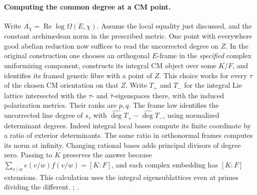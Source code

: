 \paragraph{Computing the common degree at a CM point.}
Write \(A_\chi=\operatorname{Re}\log\Omega(E,\chi)\). Assume the
local equality just discussed, and the constant archimedean norm
in the prescribed metric. One point with everywhere good abelian
reduction now suffices to read the uncorrected degree on \(Z\).
In the original construction one chooses an orthogonal \(E\)-frame
in the \emph{specified} complex uniformizing component, constructs
its integral CM object over some \(K/F\), and identifies its framed
generic fibre with a point of \(Z\). This choice works for every
\(\tau\) of the chosen CM orientation on that \(Z\). Write \(T_+\)
and \(T_-\) for the integral Lie lattice intersected with the
\(\tau\)- and \(\bar\tau\)-eigenspaces there, with the induced
polarization metrics. Their ranks are \(p,q\). The frame law
identifies the uncorrected line degree of \(s_\tau\) with
\(\widehat{\deg} T_+-\widehat{\deg} T_-\), using normalized
determinant degrees. Indeed integral local bases compute its finite
coordinate by a ratio of exterior determinants. The same ratio in
orthonormal frames computes its norm at infinity. Changing rational
bases adds principal divisors of degree zero. Passing to \(K\)
preserves the answer because
\(\sum_{v\mid w}e(v/w)f(v/w)=[K:F]\), and each complex embedding
has \([K:F]\) extensions. This calculation uses the integral
eigensublattices even at primes dividing the different.
;
.

